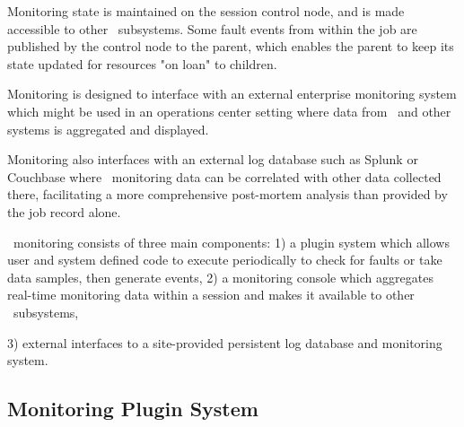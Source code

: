 Monitoring state is maintained on the session control node, and is
made accessible to other \ngrm\ subsystems.  Some fault events from
within the job are published by the control node to the parent, which
enables the parent to keep its state updated for resources "on loan"
to children.
 
Monitoring is designed to interface with an external enterprise
monitoring system which might be used in an operations center setting
where data from \ngrm\ and other systems is aggregated and displayed.

Monitoring also interfaces with an external log database such
as Splunk\cite{Splunk} or Couchbase\cite{Splunk} where \ngrm\ monitoring
data can be correlated with other data collected there, facilitating
a more comprehensive post-mortem analysis than provided by the job record
alone.

\ngrm\ monitoring consists of three main components:
1) a plugin system which allows user and system defined code to execute
periodically to check for faults or take data samples, then generate
events,
2) a monitoring console which aggregates real-time monitoring data
within a session and makes it available to other \ngrm\ subsystems,

3) external interfaces to a site-provided persistent log database
and monitoring system.

\subsection{Monitoring Plugin System}

